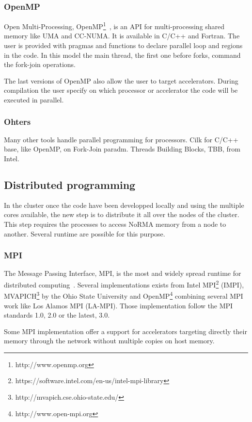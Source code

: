 \subsubsection{OpenMP}
Open Multi-Processing, OpenMP\footnote{http://www.openmp.org}~\cite{chapman2008using,supinski2017scaling}, is an API for multi-processing shared memory like UMA and CC-NUMA.
It is available in C/C++ and Fortran.
The user is provided with pragmas and functions to declare parallel loop and regions in the code. 
In this model the main thread, the first one before forks, command the fork-join operations. 

The last versions of OpenMP also allow the user to target accelerators. 
During compilation the user specify on which processor or accelerator the code will be executed in parallel. 

\subsubsection{Ohters}
Many other tools handle parallel programming for processors.
Cilk for C/C++ base, like OpenMP, on Fork-Join paradm. 
Threads Building Blocks, TBB, from Intel.

\subsection{Distributed programming}
In the cluster once the code have been developped locally and using the multiple cores available, the new step is to distribute it all over the nodes of the cluster. 
This step requires the processes to access NoRMA memory from a node to another. 
Several runtime are possible for this purpose.

\subsubsection{MPI}
The Message Passing Interface, MPI, is the most and widely spread runtime for distributed computing~\cite{gropp2014using,gropp2015using}.
Several implementations exists from Intel MPI\footnote{https://software.intel.com/en-us/intel-mpi-library} (IMPI), MVAPICH\footnote{http://mvapich.cse.ohio-state.edu/} by the Ohio State University and OpenMP\footnote{http://www.open-mpi.org} combining several MPI work like Los Alamos MPI (LA-MPI).
Those implementation follow the MPI standards 1.0, 2.0 or the latest, 3.0. 

Some MPI implementation offer a support for accelerators targeting directly their memory through the network without multiple copies on host memory. 


